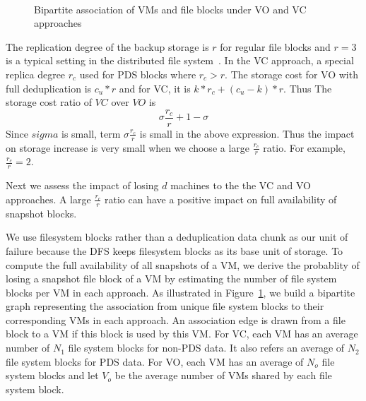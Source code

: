 \begin{figure}
    \centering
    \\
    \caption{Bipartite association of VMs and file blocks under VO and VC approaches}
    \label{fig:share}
\end{figure}

The replication degree of the backup storage 
is $r$ for regular file blocks and $r=3$ is a typical setting in the distributed
file system~\cite{googlefs03,hdfs10}.
In the VC approach, a special replica degree $r_c$ used for PDS blocks where $r_c>r$. 
The storage cost for VO with full deduplication is $c_u *r$ and for VC, it is
$ k*r_c  + (c_u-k)*r$. Thus The storage cost ratio of $VC$ over $VO$ is 
\[
\sigma \frac{r_c}{r} + 1-\sigma
\]
Since $sigma$ is small,  term $\sigma \frac{r_c}{r}$ is small in the above expression.  
Thus the impact on storage increase is very small when we choose a large $\frac{r_c}{r}$ ratio. 
For example, $\frac{r_c}{r}=2$. 

Next we  assess  the impact of losing $d$ machines 
to the the VC and VO approaches.  
A large $\frac{r_c}{r}$ ratio can have a positive impact on full availability of snapshot blocks.

We use filesystem blocks rather than a deduplication
data chunk as our unit of failure because the DFS keeps
filesystem blocks as its base unit of storage.
To  compute the full availability of all snapshots of a VM, we derive
the probablity of losing a snapshot file block of a VM by
estimating the number of file system blocks per VM in each approach.
As illustrated in Figure~\ref{fig:share},
we build a bipartite graph representing the association from unique file system blocks
to their corresponding VMs in each approach. An association edge is  drawn  from a file block  to a VM 
if this block is used by this VM. 
For VC, each VM has an 
average number of $N_1$ file system blocks for non-PDS data. 
It also refers  an average of   $N_2$ file system blocks for PDS data. 
For VO, each VM has an average  of  $N_o$ file system blocks
and let $V_o$ be the average number of VMs shared by each file system block.

